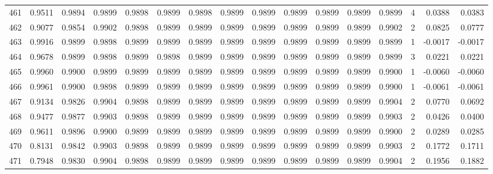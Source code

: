 \begin{tabular}{lrrrrrrrrrrrrrrr}
461 &      0.9511 &  0.9894 &  0.9899 &  0.9898 &  0.9899 &  0.9898 &  0.9899 &  0.9899 &  0.9899 &  0.9899 &   0.9899 &     0.9899 &      4 &                    0.0388 &                     0.0383 \\
462 &      0.9077 &  0.9854 &  0.9902 &  0.9898 &  0.9899 &  0.9899 &  0.9899 &  0.9899 &  0.9899 &  0.9899 &   0.9899 &     0.9902 &      2 &                    0.0825 &                     0.0777 \\
463 &      0.9916 &  0.9899 &  0.9898 &  0.9899 &  0.9899 &  0.9899 &  0.9899 &  0.9899 &  0.9899 &  0.9899 &   0.9899 &     0.9899 &      1 &                   -0.0017 &                    -0.0017 \\
464 &      0.9678 &  0.9899 &  0.9898 &  0.9899 &  0.9898 &  0.9899 &  0.9899 &  0.9899 &  0.9899 &  0.9899 &   0.9899 &     0.9899 &      3 &                    0.0221 &                     0.0221 \\
465 &      0.9960 &  0.9900 &  0.9899 &  0.9899 &  0.9899 &  0.9899 &  0.9899 &  0.9899 &  0.9899 &  0.9899 &   0.9899 &     0.9900 &      1 &                   -0.0060 &                    -0.0060 \\
466 &      0.9961 &  0.9900 &  0.9898 &  0.9899 &  0.9899 &  0.9899 &  0.9899 &  0.9899 &  0.9899 &  0.9899 &   0.9899 &     0.9900 &      1 &                   -0.0061 &                    -0.0061 \\
467 &      0.9134 &  0.9826 &  0.9904 &  0.9898 &  0.9899 &  0.9899 &  0.9899 &  0.9899 &  0.9899 &  0.9899 &   0.9899 &     0.9904 &      2 &                    0.0770 &                     0.0692 \\
468 &      0.9477 &  0.9877 &  0.9903 &  0.9898 &  0.9899 &  0.9899 &  0.9899 &  0.9899 &  0.9899 &  0.9899 &   0.9899 &     0.9903 &      2 &                    0.0426 &                     0.0400 \\
469 &      0.9611 &  0.9896 &  0.9900 &  0.9899 &  0.9899 &  0.9899 &  0.9899 &  0.9899 &  0.9899 &  0.9899 &   0.9899 &     0.9900 &      2 &                    0.0289 &                     0.0285 \\
470 &      0.8131 &  0.9842 &  0.9903 &  0.9898 &  0.9899 &  0.9899 &  0.9899 &  0.9899 &  0.9899 &  0.9899 &   0.9899 &     0.9903 &      2 &                    0.1772 &                     0.1711 \\
471 &      0.7948 &  0.9830 &  0.9904 &  0.9898 &  0.9899 &  0.9899 &  0.9899 &  0.9899 &  0.9899 &  0.9899 &   0.9899 &     0.9904 &      2 &                    0.1956 &                     0.1882 \\

\end{tabular}

